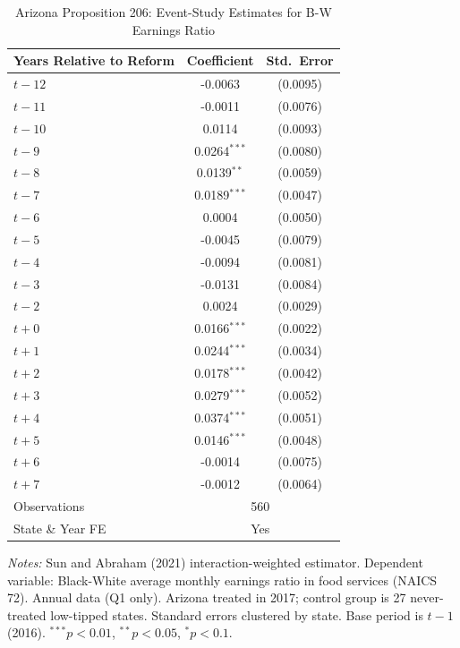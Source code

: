 \begin{table}[htbp]
\centering
\caption{Arizona Proposition 206: Event-Study Estimates for B-W Earnings Ratio}
\label{tab:event_study}
\begin{threeparttable}
\begin{tabular}{lcc}
\toprule
Years Relative to Reform & Coefficient & Std.\ Error \\
\midrule
$t-12$ & -0.0063 & (0.0095) \\
$t-11$ & -0.0011 & (0.0076) \\
$t-10$ & 0.0114 & (0.0093) \\
$t-9$ & 0.0264$^{***}$ & (0.0080) \\
$t-8$ & 0.0139$^{**}$ & (0.0059) \\
$t-7$ & 0.0189$^{***}$ & (0.0047) \\
$t-6$ & 0.0004 & (0.0050) \\
$t-5$ & -0.0045 & (0.0079) \\
$t-4$ & -0.0094 & (0.0081) \\
$t-3$ & -0.0131 & (0.0084) \\
$t-2$ & 0.0024 & (0.0029) \\
$t+0$ & 0.0166$^{***}$ & (0.0022) \\
$t+1$ & 0.0244$^{***}$ & (0.0034) \\
$t+2$ & 0.0178$^{***}$ & (0.0042) \\
$t+3$ & 0.0279$^{***}$ & (0.0052) \\
$t+4$ & 0.0374$^{***}$ & (0.0051) \\
$t+5$ & 0.0146$^{***}$ & (0.0048) \\
$t+6$ & -0.0014 & (0.0075) \\
$t+7$ & -0.0012 & (0.0064) \\
\midrule
Observations & \multicolumn{2}{c}{560} \\
State \& Year FE & \multicolumn{2}{c}{Yes} \\
\bottomrule
\end{tabular}
\begin{tablenotes}[flushleft]\footnotesize
\item \textit{Notes:} Sun and Abraham (2021) interaction-weighted estimator. Dependent variable: Black-White average monthly earnings ratio in food services (NAICS 72). Annual data (Q1 only). Arizona treated in 2017; control group is 27 never-treated low-tipped states. Standard errors clustered by state. Base period is $t-1$ (2016). $^{***}p<0.01$, $^{**}p<0.05$, $^{*}p<0.1$.
\end{tablenotes}
\end{threeparttable}
\end{table}
